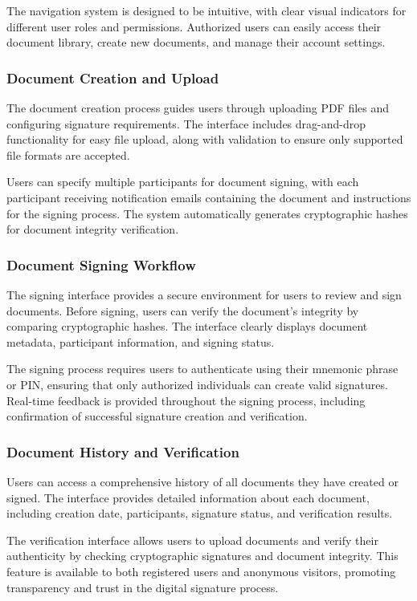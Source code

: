 The navigation system is designed to be intuitive, with clear visual indicators for different user roles and permissions. Authorized users can easily access their document library, create new documents, and manage their account settings.

\subsubsection{Document Creation and Upload}
The document creation process guides users through uploading PDF files and configuring signature requirements. The interface includes drag-and-drop functionality for easy file upload, along with validation to ensure only supported file formats are accepted.

Users can specify multiple participants for document signing, with each participant receiving notification emails containing the document and instructions for the signing process. The system automatically generates cryptographic hashes for document integrity verification.

\subsubsection{Document Signing Workflow}
The signing interface provides a secure environment for users to review and sign documents. Before signing, users can verify the document's integrity by comparing cryptographic hashes. The interface clearly displays document metadata, participant information, and signing status.

The signing process requires users to authenticate using their mnemonic phrase or PIN, ensuring that only authorized individuals can create valid signatures. Real-time feedback is provided throughout the signing process, including confirmation of successful signature creation and verification.

\subsubsection{Document History and Verification}
Users can access a comprehensive history of all documents they have created or signed. The interface provides detailed information about each document, including creation date, participants, signature status, and verification results.

The verification interface allows users to upload documents and verify their authenticity by checking cryptographic signatures and document integrity. This feature is available to both registered users and anonymous visitors, promoting transparency and trust in the digital signature process.


